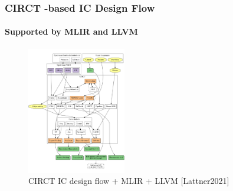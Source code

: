 \documentclass[xcolor={usenames,dvipsnames},hyperref={hyperindex,bookmarks}]{beamer}
\begin{document}
\begin{frame}
	\frametitle{CIRCT -based IC Design Flow}
	\framesubtitle{Supported by MLIR and LLVM}
	
	\begin{figure}
		\centering
		\includegraphics[height=2.2in]{./pics/CIRCTMLIR}
		\caption{CIRCT IC design flow + MLIR + LLVM [Lattner2021]}
	\end{figure}
\end{frame}


















%		
%		
\end{document}

